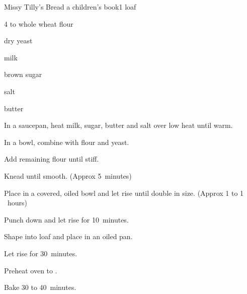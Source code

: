 \begin{recipe}{ Missy Tilly's Bread }{a children's book}{1 loaf}


\begin{ingredients}
\item 4 to \C{4\third} whole wheat flour
\item \tp{4\half} dry yeast
\item \C{1\threequarter} milk
\item \C{\half} brown sugar
\item {} salt
\item {} butter
\end{ingredients}

\begin{directions}
\item In a saucepan, heat milk, sugar, butter and salt over low heat until warm.
\item In a bowl, combine with  flour and yeast.
\item Add remaining flour until stiff.
\item Knead until smooth. (Approx 5~minutes)
\item Place in a covered, oiled bowl and let rise until double in size. (Approx 1 to 1 \half~hours)
\item Punch down and let rise for 10~minutes.
\item Shape into loaf and place in an oiled pan.
\item Let rise for 30~minutes.
\item Preheat oven to .
\item Bake 30 to 40~minutes.
\end{directions}
\end{recipe}
